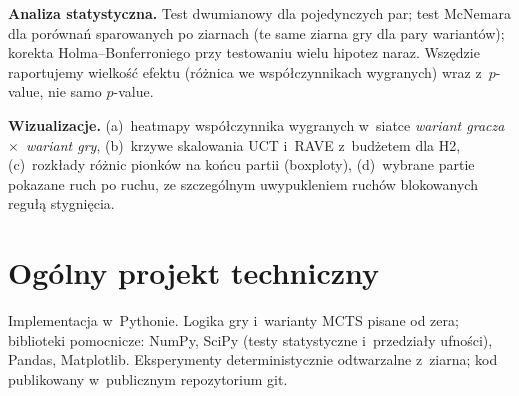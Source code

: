 \documentclass[11pt,a4paper]{article}
\begin{document}
\textbf{Analiza statystyczna.} Test dwumianowy dla pojedynczych par; test McNemara dla porównań sparowanych po ziarnach (te same ziarna gry dla pary wariantów); korekta Holma--Bonferroniego przy testowaniu wielu hipotez naraz. Wszędzie raportujemy wielkość efektu (różnica we współczynnikach wygranych) wraz z~$p$-value, nie samo $p$-value.

\textbf{Wizualizacje.} (a)~heatmapy współczynnika wygranych w~siatce \emph{wariant gracza}~$\times$~\emph{wariant gry}, (b)~krzywe skalowania UCT i~RAVE z~budżetem dla H2, (c)~rozkłady różnic pionków na końcu partii (boxploty), (d)~wybrane partie pokazane ruch po ruchu, ze szczególnym uwypukleniem ruchów blokowanych regułą stygnięcia.

\section{Ogólny projekt techniczny}

Implementacja w~Pythonie. Logika gry i~warianty MCTS pisane od zera; biblioteki pomocnicze: NumPy, SciPy (testy statystyczne i~przedziały ufności), Pandas, Matplotlib. Eksperymenty deterministycznie odtwarzalne z~ziarna; kod publikowany w~publicznym repozytorium git.



\end{document}
